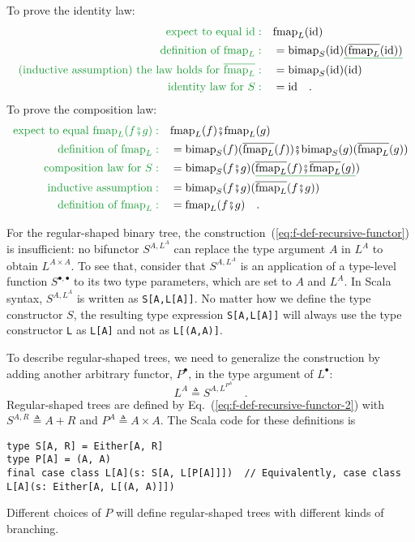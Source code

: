 To prove the identity law:
\begin{align*}
{\color{greenunder}\text{expect to equal }\text{id}:}\quad & \text{fmap}_{L}(\text{id})\\
{\color{greenunder}\text{definition of }\text{fmap}_{L}:}\quad & =\text{bimap}_{S}(\text{id})\gunderline{(\overline{\text{fmap}_{L}}(\text{id}))}\\
{\color{greenunder}\text{(inductive assumption) the law holds for }\overline{\text{fmap}_{L}}:}\quad & =\text{bimap}_{S}(\text{id})(\text{id})\\
{\color{greenunder}\text{identity law for }S:}\quad & =\text{id}\quad.
\end{align*}
To prove the composition law:
\begin{align*}
{\color{greenunder}\text{expect to equal }\text{fmap}_{L}(f\bef g):}\quad & \text{fmap}_{L}(f)\bef\text{fmap}_{L}(g)\\
{\color{greenunder}\text{definition of }\text{fmap}_{L}:}\quad & =\text{bimap}_{S}(f)(\overline{\text{fmap}_{L}}(f))\bef\text{bimap}_{S}(g)(\overline{\text{fmap}_{L}}(g))\\
{\color{greenunder}\text{composition law for }S:}\quad & =\text{bimap}_{S}(f\bef g)(\gunderline{\overline{\text{fmap}_{L}}(f)\bef\overline{\text{fmap}_{L}}(g)})\\
{\color{greenunder}\text{inductive assumption}:}\quad & =\text{bimap}_{S}(f\bef g)(\overline{\text{fmap}_{L}}(f\bef g))\\
{\color{greenunder}\text{definition of }\text{fmap}_{L}:}\quad & =\text{fmap}_{L}(f\bef g)\quad.
\end{align*}

For the regular-shaped binary tree, the construction~(\ref{eq:f-def-recursive-functor})
is insufficient: no bifunctor $S^{A,L^{A}}$ can replace the type
argument $A$ in $L^{A}$ to obtain $L^{A\times A}$. To see that,
consider that $S^{A,L^{A}}$ is an application of a type-level function
$S^{\bullet,\bullet}$ to its two type parameters, which are set to
$A$ and $L^{A}$. In Scala syntax, $S^{A,L^{A}}$ is written as \lstinline!S[A,L[A]]!.
No matter how we define the type constructor $S$, the resulting type
expression \lstinline!S[A,L[A]]! will always use the type constructor
\lstinline!L! as \lstinline!L[A]! and not as \lstinline!L[(A,A)]!. 

To describe regular-shaped trees, we need to generalize the construction
by adding another arbitrary functor, $P^{\bullet}$, in the type argument
of $L^{\bullet}$:
\begin{equation}
L^{A}\triangleq S^{A,L^{P^{A}}}\quad.\label{eq:f-def-recursive-functor-2}
\end{equation}
Regular-shaped trees are defined by Eq.~(\ref{eq:f-def-recursive-functor-2})
with $S^{A,R}\triangleq A+R$ and $P^{A}\triangleq A\times A$. The
Scala code for these definitions is
\begin{lstlisting}
type S[A, R] = Either[A, R]
type P[A] = (A, A)
final case class L[A](s: S[A, L[P[A]]])  // Equivalently, case class L[A](s: Either[A, L[(A, A)]])
\end{lstlisting}
Different choices of $P$ will define regular-shaped trees with different
kinds of branching.

